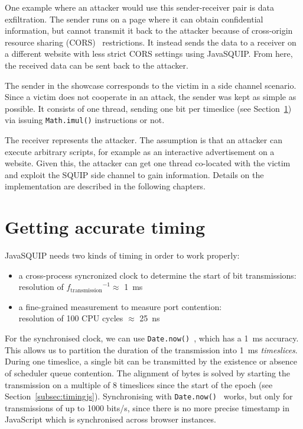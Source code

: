 \documentclass[11pt,
  titlepage=false,
  parskip=half,      %
]{scrreprt}
\begin{document}
One example where an attacker would use this sender-receiver pair is data exfiltration.
The sender runs on a page where it can obtain confidential information,
but cannot transmit it back to the attacker because of cross-origin resource sharing (CORS)~\cite{cors} restrictions.
It instead sends the data to a receiver on a different website with less strict CORS settings using JavaSQUIP.
From here, the received data can be sent back to the attacker.

The sender in the showcase corresponds to the victim in a side channel scenario.
Since a victim does not cooperate in an attack, the sender was kept as simple as possible.
It consists of one thread, sending one bit per timeslice (see Section~\ref{sec:accurate-timing}) via issuing \texttt{Math.imul()} instructions or not.

The receiver represents the attacker.
The assumption is that an attacker can execute arbitrary scripts, for example as an interactive advertisement on a website.
Given this, the attacker can get one thread co-located with the victim and exploit the SQUIP side channel to gain information.
Details on the implementation are described in the following chapters.

\section{Getting accurate timing}
\label{sec:accurate-timing}
JavaSQUIP needs two kinds of timing in order to work properly:
\begin{itemize}
    \item a cross-process syncronized clock to determine the start of bit transmissions:\\
    resolution of ${f_{\text{transmission}}}^{-1} \approx$ 1~ms
    \item a fine-grained measurement to measure port contention:\\
    resolution of 100 CPU cycles $\approx$ 25~ns
\end{itemize}

For the synchronised clock, we can use \texttt{Date.now()}~\cite{datenow}, which has a 1~ms accuracy.
This allows us to partition the duration of the transmission into 1~ms \textit{timeslices}.
During one timeslice, a single bit can be transmitted by the existence or absence of scheduler queue contention.
The alignment of bytes is solved by starting the transmission on a multiple of 8 timeslices since the start of the epoch (see Section~\ref{subsec:timingjs}).
Synchronising with \texttt{Date.now()}~\cite{datenow} works, but only for transmissions of up to 1000 bits/s,
since there is no more precise timestamp in JavaScript which is synchronised across browser instances.
\end{document}
